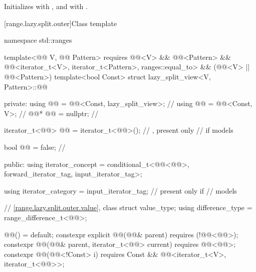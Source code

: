 \begin{itemdescr}
\pnum
\effects
Initializes  with , and
 with .
\end{itemdescr}

[range.lazy.split.outer]{Class template }

%
\begin{codeblock}
namespace std::ranges {
  template<@@ V, @@ Pattern>
    requires @@<V> && @@<Pattern> &&
             @@<iterator_t<V>, iterator_t<Pattern>, ranges::equal_to> &&
             (@@<V> || @@<Pattern>)
  template<bool Const>
  struct lazy_split_view<V, Pattern>::@@ {
  private:
    using @@ = @@<Const, lazy_split_view>;     // \expos
    using @@ = @@<Const, V>;                     // \expos
    @@* @@ = nullptr;                              // \expos

    iterator_t<@@> @@ = iterator_t<@@>();         // \expos, present only
                                                            // if  models 

    bool @@ = false;                           // \expos

  public:
    using iterator_concept  =
      conditional_t<@@<@@>, forward_iterator_tag, input_iterator_tag>;

    using iterator_category = input_iterator_tag;           // present only if 
                                                            // models 

    // \ref{range.lazy.split.outer.value}, class 
    struct value_type;
    using difference_type   = range_difference_t<@@>;

    @@() = default;
    constexpr explicit @@(@@& parent)
      requires (!@@<@@>);
    constexpr @@(@@& parent, iterator_t<@@> current)
      requires @@<@@>;
    constexpr @@(@@<!Const> i)
      requires Const && @@<iterator_t<V>, iterator_t<@@>>;

}}
\end{codeblock}
